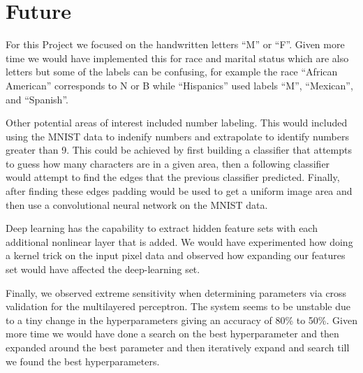 \section{Future}



For this Project we focused on the handwritten letters ``M'' or ``F''.  Given more time we would have implemented this for race and marital status which are also letters but some of the labels can be confusing, for example the race ``African American'' corresponds to N or B while ``Hispanics'' used labels ``M'', ``Mexican'', and ``Spanish''.

Other potential areas of interest included number labeling.  This would included using the MNIST data to indenify numbers and extrapolate to identify numbers greater than 9.  This could be achieved by first building a classifier that attempts to guess how many characters are in a given area, then a following classifier would attempt to find the edges that the previous classifier predicted.  Finally, after finding these edges padding would be used to get a uniform image area and then use a convolutional neural network on the MNIST data.

Deep learning has the capability to extract hidden feature sets with each additional nonlinear layer that is added.  We would have experimented how doing a kernel trick on the input pixel data and observed how expanding our features set would have affected the deep-learning set.

Finally, we observed extreme sensitivity when determining parameters via cross validation for the multilayered perceptron.  The system seems to be unstable due to a tiny change in the hyperparameters giving an accuracy of 80\% to 50\%.  Given more time we would have done a search on the best hyperparameter and then expanded around the best parameter and then iteratively expand and search till we found the best hyperparameters.
